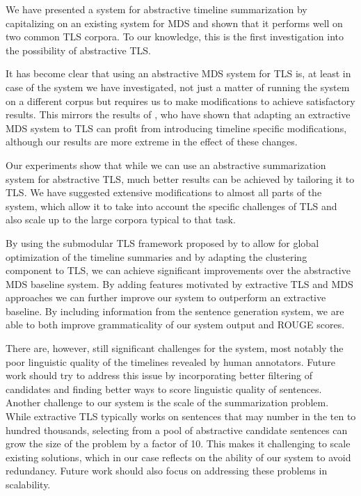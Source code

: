 \documentclass[a4paper,BCOR=10mm]{report}
\numberwithin{lemma}{chapter}
\numberwithin{definition}{chapter}
\begin{document}
We have presented a system for abstractive timeline summarization by capitalizing on an existing system for MDS and shown that it performs well on two common TLS corpora. To our knowledge, this is the first investigation into the possibility of abstractive TLS.

It has become clear that using an abstractive MDS system for TLS is, at least in case of the system we have investigated, not just a matter of running the system on a different corpus but requires us to make modifications to achieve satisfactory results. This mirrors the results of \citet{markert}, who have shown that adapting an extractive MDS system to TLS can profit from introducing timeline specific modifications, although our results are more extreme in the effect of these changes.

Our experiments show that while we can use an abstractive summarization system for abstractive TLS, much better results can be achieved by tailoring it to TLS.
We have suggested extensive modifications to almost all parts of the system, which allow it to take into account the specific challenges of TLS and also scale up to the large corpora typical to that task.

By using the submodular TLS framework proposed by \citet{markert} to allow for global optimization of the timeline summaries and by adapting the clustering component to TLS, we can achieve significant improvements over the abstractive MDS baseline system.
By adding features motivated by extractive TLS and MDS approaches we can further improve our system to outperform an extractive baseline.
By including information from the sentence generation system, we are able to both improve grammaticality of our system output and ROUGE scores.

There are, however, still significant challenges for the system, most notably the poor linguistic quality of the timelines revealed by human annotators.
Future work should try to address this issue by incorporating better filtering of candidates and finding better ways to score linguistic quality of sentences.
Another challenge to our system is the scale of the summarization problem. While extractive TLS typically works on sentences that may number in the ten to hundred thousands, selecting from a pool of abstractive candidate sentences can grow the size of the problem by a factor of 10. This makes it challenging to scale existing solutions, which in our case reflects on the ability of our system to avoid redundancy.
Future work should also focus on addressing these problems in scalability.
\end{document}
